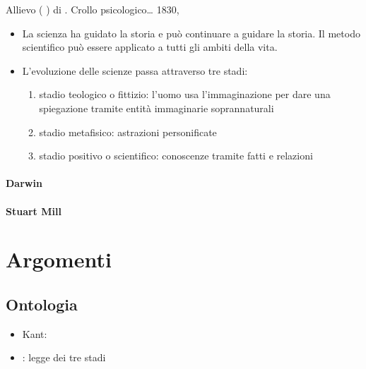 \documentclass[letterpaper,10pt,italian]{jupyterBook}
\begin{document}
\sphinxAtStartPar
{} Allievo ( ) di {\hyperref[\detokenize{ch/history:pc-saint-simon}]{}}. Crollo psicologico…
 1830, 
\begin{itemize}
\item {} 
\sphinxAtStartPar
La scienza ha guidato la storia e può continuare a guidare la storia. Il metodo scientifico può essere applicato a tutti gli ambiti della vita.

\item {} 
\sphinxAtStartPar
{} L’evoluzione delle scienze passa attraverso tre stadi:
\begin{enumerate}
%
\item {} 
\sphinxAtStartPar
stadio teologico o fittizio: l’uomo usa l’immaginazione per dare una spiegazione tramite entità immaginarie soprannaturali

\item {} 
\sphinxAtStartPar
stadio metafisico: astrazioni personificate

\item {} 
\sphinxAtStartPar
stadio positivo o scientifico: conoscenze tramite fatti e relazioni

\end{enumerate}

\end{itemize}
\subsubsection*{Darwin}
\subsubsection*{Stuart Mill}

\sphinxstepscope


\chapter{Argomenti}
\label{\detokenize{ch/topics:argomenti}}\label{\detokenize{ch/topics:philosophy-topics}}\label{\detokenize{ch/topics::doc}}

\section{Ontologia}
\label{\detokenize{ch/topics:ontologia}}\begin{itemize}
\item {} 
\sphinxAtStartPar
Kant:

\item {} 
\sphinxAtStartPar
{\hyperref[\detokenize{ch/history:pc-comte}]{}}: legge dei tre stadi

\end{itemize}
\end{document}
